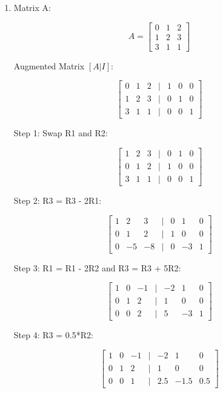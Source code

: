 \documentclass{article}
\begin{document}
\begin{enumerate}
\[
U = \begin{bmatrix}
1 & 2 & 2 \\
0 & -4 & -6 \\
0 & 0 & -1
\end{bmatrix}
\]

These matrices L and U satisfy the equation \(A = LU\).

\item 

Matrix A:

\[
A = \begin{bmatrix}
0 & 1 & 2 \\
1 & 2 & 3 \\
3 & 1 & 1
\end{bmatrix}
\]

Augmented Matrix \([A | I]\):

\[
\begin{bmatrix}
0 & 1 & 2 & | & 1 & 0 & 0 \\
1 & 2 & 3 & | & 0 & 1 & 0 \\
3 & 1 & 1 & | & 0 & 0 & 1
\end{bmatrix}
\]

Step 1: Swap R1 and R2:

\[
\begin{bmatrix}
1 & 2 & 3 & | & 0 & 1 & 0 \\
0 & 1 & 2 & | & 1 & 0 & 0 \\
3 & 1 & 1 & | & 0 & 0 & 1
\end{bmatrix}
\]

Step 2: R3 = R3 - 2R1:

\[
\begin{bmatrix}
1 & 2 & 3 & | & 0 & 1 & 0 \\
0 & 1 & 2 & | & 1 & 0 & 0 \\
0 & -5 & -8 & | & 0 & -3 & 1
\end{bmatrix}
\]

Step 3: R1 = R1 - 2R2 and R3 = R3 + 5R2:

\[
\begin{bmatrix}
1 & 0 & -1 & | & -2 & 1 & 0 \\
0 & 1 & 2 & | & 1 & 0 & 0 \\
0 & 0 & 2 & | & 5 & -3 & 1
\end{bmatrix}
\]

Step 4: R3 = 0.5*R2:

\[
\begin{bmatrix}
1 & 0 & -1 & | & -2 & 1 & 0 \\
0 & 1 & 2 & | & 1 & 0 & 0 \\
0 & 0 & 1 & | & 2.5 & -1.5 & 0.5
\end{bmatrix}
\]


\end{enumerate}
\end{document}
